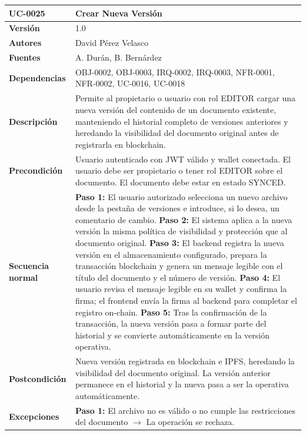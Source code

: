 \documentclass[11pt, a4paper]{article}
\begin{document}
\begin{longtable}{|p{4cm}|p{10cm}|}
\hline
\textbf{UC-0025} & Crear Nueva Versión \\
\hline
\textbf{Versión} & 1.0 \\
\hline
\textbf{Autores} & David Pérez Velasco \\
\hline
\textbf{Fuentes} & A. Durán, B. Bernárdez \\
\hline
\textbf{Dependencias} & OBJ-0002, OBJ-0003, IRQ-0002, IRQ-0003, NFR-0001, NFR-0002, UC-0016, UC-0018 \\
\hline
\textbf{Descripción} & Permite al propietario o usuario con rol EDITOR cargar una nueva versión del contenido de un documento existente, manteniendo el historial completo de versiones anteriores y heredando la visibilidad del documento original antes de registrarla en blockchain. \\
\hline
\textbf{Precondición} & Usuario autenticado con JWT válido y wallet conectada. El usuario debe ser propietario o tener rol EDITOR sobre el documento. El documento debe estar en estado SYNCED. \\
\hline
\textbf{Secuencia normal} &
\textbf{Paso 1:} El usuario autorizado selecciona un nuevo archivo desde la pestaña de versiones e introduce, si lo desea, un comentario de cambio.\newline
\textbf{Paso 2:} El sistema aplica a la nueva versión la misma política de visibilidad y protección que al documento original.\newline
\textbf{Paso 3:} El backend registra la nueva versión en el almacenamiento configurado, prepara la transacción blockchain y genera un mensaje legible con el título del documento y el número de versión.\newline
\textbf{Paso 4:} El usuario revisa el mensaje legible en su wallet y confirma la firma; el frontend envía la firma al backend para completar el registro on-chain.\newline
\textbf{Paso 5:} Tras la confirmación de la transacción, la nueva versión pasa a formar parte del historial y se convierte automáticamente en la versión operativa.\\
\hline
\textbf{Postcondición} & Nueva versión registrada en blockchain e IPFS, heredando la visibilidad del documento original. La versión anterior permanece en el historial y la nueva pasa a ser la operativa automáticamente. \\
\hline
\textbf{Excepciones} &
\textbf{Paso 1:} El archivo no es válido o no cumple las restricciones del documento $\rightarrow$ La operación se rechaza.\newline

\end{longtable}
\end{document}
